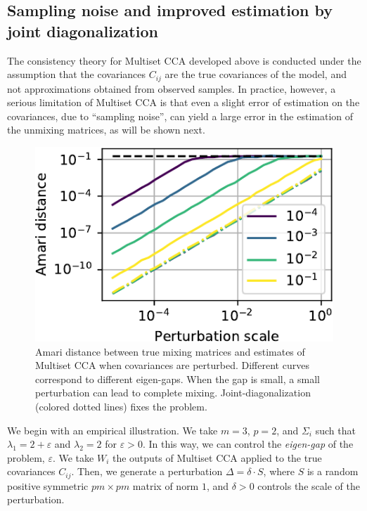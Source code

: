 \subsection{Sampling noise and improved estimation by joint diagonalization} \label{sec:samplingnoise}


The consistency theory for Multiset CCA developed above is conducted under the assumption that the
covariances $C_{ij}$ are the true covariances of the model, and not
approximations obtained from observed samples. In practice, however, a serious limitation of Multiset CCA is that even a slight error of estimation on the covariances, due to ``sampling noise'', can yield a large error in the estimation of the unmixing matrices, as will be shown next.


\begin{figure}
\centering
\includegraphics[width=.99\linewidth]{figures/amvica/multicca_gap_jd.pdf}
\caption{Amari distance between true mixing matrices and estimates of Multiset CCA when covariances are perturbed. Different curves correspond to different eigen-gaps. When the gap is small, a small perturbation can lead to complete mixing. Joint-diagonalization (colored dotted lines) fixes the problem.}
\label{fig:cca_gap}
\end{figure}
We begin with an empirical illustration. We take $m=3$, $p=2$, and $\Sigma_i$ such that $\lambda_1 = 2 + \varepsilon$ and $\lambda_2 =2$ for $\varepsilon > 0$.
%
In this way, we can control the \emph{eigen-gap} of the problem, $\varepsilon$.
%
%
We take $W_i$ the outputs of Multiset CCA applied to the true covariances $C_{ij}$.
%
Then, we generate a perturbation $\Delta = \delta \cdot S$, where $S$ is a random positive symmetric $pm \times pm$ matrix of norm $1$, and $\delta >0$ controls the scale of the perturbation. 
